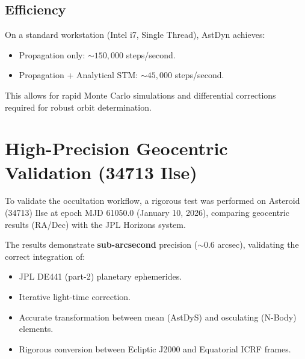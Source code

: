\subsection{Efficiency}
On a standard workstation (Intel i7, Single Thread), AstDyn achieves:
\begin{itemize}
    \item Propagation only: $\sim 150,000$ steps/second.
    \item Propagation + Analytical STM: $\sim 45,000$ steps/second.
\end{itemize}
This allows for rapid Monte Carlo simulations and differential corrections required for robust orbit determination.

\section{High-Precision Geocentric Validation (34713 Ilse)}

To validate the occultation workflow, a rigorous test was performed on Asteroid (34713) Ilse at epoch MJD 61050.0 (January 10, 2026), comparing geocentric results (RA/Dec) with the JPL Horizons system.

\begin{table}[H]
\centering
\caption{Astrometric Validation (34713 Ilse) @ MJD 61050.0}
\end{table}

The results demonstrate \textbf{sub-arcsecond} precision ($\sim 0.6$ arcsec), validating the correct integration of:
\begin{itemize}
    \item JPL DE441 (part-2) planetary ephemerides.
    \item Iterative light-time correction.
    \item Accurate transformation between mean (AstDyS) and osculating (N-Body) elements.
    \item Rigorous conversion between Ecliptic J2000 and Equatorial ICRF frames.
\end{itemize}

